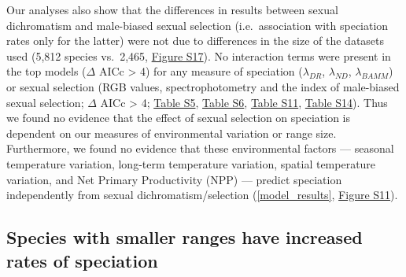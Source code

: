 \documentclass[]{article}
\begin{document}
Our analyses also show that the differences in results between sexual
dichromatism and male-biased sexual selection (i.e.~association with
speciation rates only for the latter) were not due to differences in the
size of the datasets used (5,812 species vs.~2,465,
\href{https://justincally.github.io/SexualSelection_Speciation/#testing_the_sexual_dichromatism_dataset_using_the_same_data_points_as_the_sexual_selection_dataset}{Figure S17}).
No interaction terms were present in the top models (\(\Delta\) AICc
\textgreater{} 4) for any measure of speciation (\(\lambda_{DR}\),
\(\lambda_{ND}\), \(\lambda_{BAMM}\)) or sexual selection (RGB values,
spectrophotometry and the index of male-biased sexual selection;
\(\Delta\) AICc \textgreater{} 4;
\href{https://justincally.github.io/SexualSelection_Speciation/#pgls_models_on_dr_and_nd}{Table S5},
\href{https://justincally.github.io/SexualSelection_Speciation/#pgls_models_on_bamm_estimates}{Table S6},
\href{https://justincally.github.io/SexualSelection_Speciation/#subsetted_analysis_with_spectrophotometry_data}{Table S11},
\href{https://justincally.github.io/SexualSelection_Speciation/#analysis_using_male-biased_measure_of_sexual_selection}{Table S14}).
Thus we found no evidence that the effect of sexual selection on
speciation is dependent on our measures of environmental variation or
range size. Furthermore, we found no evidence that these environmental
factors --- seasonal temperature variation, long-term temperature
variation, spatial temperature variation, and Net Primary Productivity
(NPP) --- predict speciation independently from sexual
dichromatism/selection (\autoref{model_results},
\href{https://justincally.github.io/SexualSelection_Speciation/#subsetted_analysis_with_spectrophotometry_data}{Figure S11}).

\hypertarget{species-with-smaller-ranges-have-increased-rates-of-speciation}{%
\subsection{Species with smaller ranges have increased rates of
speciation}\label{species-with-smaller-ranges-have-increased-rates-of-speciation}}
\end{document}
